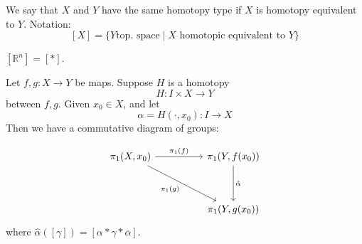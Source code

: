 \begin{definition}
    We say that \( X \) and \( Y \)
    have the same homotopy type if \( X \)
    is homotopy equivalent to \( Y \).
    Notation:
    \[
      [X] = \{ Y \text{top. space} \mid X \text{ homotopic equivalent to } Y \} 
    \]
\end{definition}

\begin{example}
  \( [\mathbb{R}^n] = [*] \).
\end{example}

\begin{lemma}
  \label{lma:hom_diag_lemma}
    Let \( f, g: X \to Y \) be maps.
    Suppose \( H \) is a homotopy
    \[
      H: I \times X \to Y
    \]
    between \( f, g \).
    Given \( x_0 \in X \), and let
    \[
      \alpha = H(\cdot, x_0): I \to X
    \]
    Then we have a commutative diagram 
    of groups:

\[\begin{tikzcd}
	{\pi_1(X, x_0)} && {\pi_1(Y, f(x_0))} \\
	\\
	&& {\pi_1(Y, g(x_0))}
	\arrow["{\pi_1(f)}", from=1-1, to=1-3]
	\arrow["{\pi_1(g)}"', from=1-1, to=3-3]
	\arrow["{\hat{\alpha}}", from=1-3, to=3-3]
\end{tikzcd}\]
where \( \hat{\alpha}([\gamma]) = [\alpha * \gamma * \overline{\alpha}] \).
\end{lemma}

